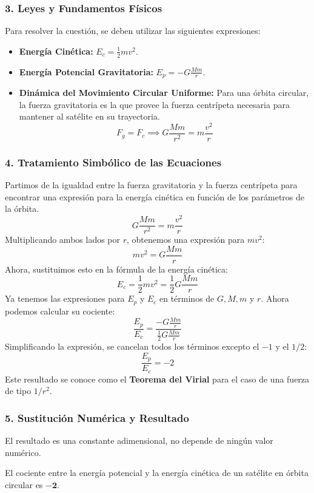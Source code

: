 \subsubsection*{3. Leyes y Fundamentos Físicos}
Para resolver la cuestión, se deben utilizar las siguientes expresiones:
\begin{itemize}
    \item \textbf{Energía Cinética:} $E_c = \frac{1}{2}mv^2$.
    \item \textbf{Energía Potencial Gravitatoria:} $E_p = -G\frac{Mm}{r}$.
    \item \textbf{Dinámica del Movimiento Circular Uniforme:} Para una órbita circular, la fuerza gravitatoria es la que provee la fuerza centrípeta necesaria para mantener al satélite en su trayectoria.
    $$F_g = F_c \implies G\frac{Mm}{r^2} = m\frac{v^2}{r}$$
\end{itemize}

\subsubsection*{4. Tratamiento Simbólico de las Ecuaciones}
Partimos de la igualdad entre la fuerza gravitatoria y la fuerza centrípeta para encontrar una expresión para la energía cinética en función de los parámetros de la órbita.
$$G\frac{Mm}{r^2} = m\frac{v^2}{r}$$
Multiplicando ambos lados por $r$, obtenemos una expresión para $mv^2$:
$$mv^2 = G\frac{Mm}{r}$$
Ahora, sustituimos esto en la fórmula de la energía cinética:
$$E_c = \frac{1}{2}mv^2 = \frac{1}{2} G\frac{Mm}{r}$$
Ya tenemos las expresiones para $E_p$ y $E_c$ en términos de $G, M, m$ y $r$. Ahora podemos calcular su cociente:
$$\frac{E_p}{E_c} = \frac{-G\frac{Mm}{r}}{\frac{1}{2}G\frac{Mm}{r}}$$
Simplificando la expresión, se cancelan todos los términos excepto el $-1$ y el $1/2$:
$$\frac{E_p}{E_c} = -2$$
Este resultado se conoce como el \textbf{Teorema del Virial} para el caso de una fuerza de tipo $1/r^2$.

\subsubsection*{5. Sustitución Numérica y Resultado}
El resultado es una constante adimensional, no depende de ningún valor numérico.
\begin{cajaresultado}
El cociente entre la energía potencial y la energía cinética de un satélite en órbita circular es $\boldsymbol{-2}$.
\end{cajaresultado}

